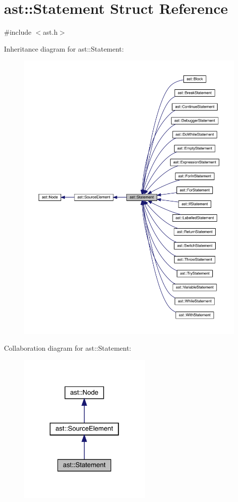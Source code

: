 \hypertarget{structast_1_1_statement}{}\section{ast\+:\+:Statement Struct Reference}
\label{structast_1_1_statement}


{\ttfamily \#include $<$ast.\+h$>$}



Inheritance diagram for ast\+:\+:Statement\+:\nopagebreak
\begin{figure}[H]
\begin{center}
\leavevmode
\includegraphics[width=350pt]{structast_1_1_statement__inherit__graph}
\end{center}
\end{figure}


Collaboration diagram for ast\+:\+:Statement\+:\nopagebreak
\begin{figure}[H]
\begin{center}
\leavevmode
\includegraphics[width=183pt]{structast_1_1_statement__coll__graph}
\end{center}
\end{figure}
